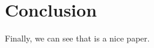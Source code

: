 
\section{Conclusion}\label{sec:Conclusion}

Finally, we can see that \cite{liuWang2013:agentTypesHLPE} is a nice paper.
